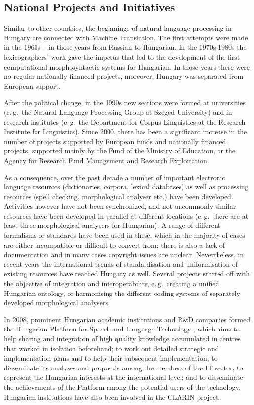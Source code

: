 \begin{multicols}{2}
  \subsection{National Projects and Initiatives}

  Similar to other countries, the beginnings of natural language processing in Hungary are connected with Machine Translation. The first attempts were made in the 1960s -- in those years from Russian to Hungarian. In the 1970s-1980s the lexicographers' work gave the impetus that led to the development of the first computational morphosyntactic systems for Hungarian. In those years there were no regular nationally financed projects, moreover, Hungary was separated from European support.

      After the political change, in the 1990s new sections were formed at universities (e.\,g.~the Natural Language Processing Group at Szeged University) and in research institutes (e.\,g.~the Department for Corpus Linguistics at the Research Institute for Linguistics). Since 2000, there has been a significant increase in the number of projects supported by European funds and nationally financed projects, supported mainly by the Fund of the Ministry of Education, or the Agency for Research Fund Management and Research Exploitation. 

      As a consequence, over the past decade a number of important electronic language resources (dictionaries, corpora, lexical databases) as well as processing resources (spell checking, morphological analyser etc.) have been developed. Activities however have not been synchronized, and not uncommonly similar resources have been developed in parallel at different locations (e.\,g.~there are at least three morphological analysers for Hungarian). A range of different formalisms or standards have been used in these, which in the majority of cases are either incompatible or difficult to convert from; there is also a lack of documentation and in many cases copyright issues are unclear. Nevertheless, in recent years the international trends of standardisation and uniformisation of existing resources have reached Hungary as well. Several projects started off with the objective of integration and interoperability, e.\,g.~creating a unified Hungarian ontology, or harmonising the different coding systems of separately developed morphological analysers.

      In 2008, prominent Hungarian academic institutions and R\&D companies formed the Hungarian Platform for Speech and Language Technology \cite{platform}, which aims to help sharing and integration of high quality knowledge accumulated in centres that worked in isolation beforehand; to work out detailed strategic and implementation plans and to help their subsequent implementation; to disseminate its analyses and proposals among the members of the IT sector; to represent the Hungarian interests at the international level; and to disseminate the achievements of the Platform among the potential users of the technology. Hungarian institutions have also been involved in the CLARIN project. 


\end{multicols}
